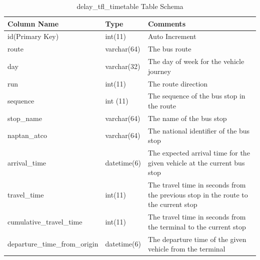 \begin{table}
\centering
\begin{tabular}{@{}llp{6cm}@{}} \toprule
Column Name & Type & Comments\\ \midrule
id(Primary Key) & int(11)  & Auto Increment\\ [0.4cm]
route & varchar(64) & The bus route \\ [0.4cm]
day & varchar(32) & The day of week for the vehicle journey \\ [0.4cm]
run & int(11) & The route direction \\ [0.4cm]
sequence & int (11) & The sequence of the bus stop in the route \\ [0.4cm]
stop\_name & varchar(64) & The name of the bus stop \\ [0.4cm]
naptan\_atco & varchar(64) & The national identifier of the bus stop \\ [0.4cm]
arrival\_time & datetime(6) & The expected arrival time for the given vehicle at the current bus stop \\ [0.4cm]
travel\_time & int(11) & The travel time in seconds from the previous stop in the route to the current stop \\ [0.4cm]
cumulative\_travel\_time & int(11) & The travel time  in seconds from the terminal to the current stop \\ [0.4cm]
departure\_time\_from\_origin & datetime(6) & The departure time of the given vehicle from the terminal \\
\bottomrule
\end{tabular}
\caption{delay\_tfl\_timetable Table Schema}
\label{table:delay_tfl_timetable}
\end{table}

